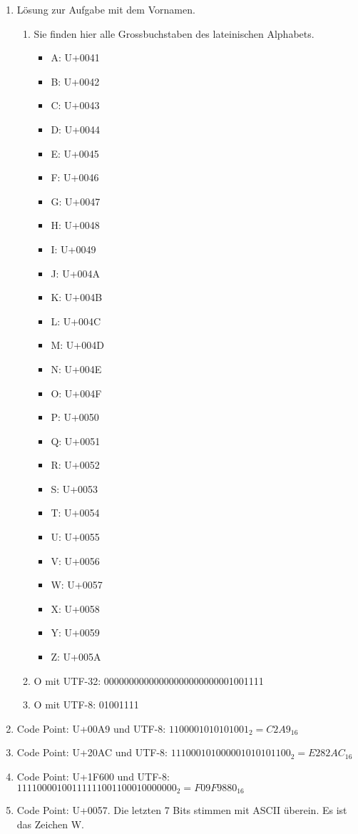 \begin{enumerate}
\item Lösung zur Aufgabe mit dem Vornamen.
\begin{enumerate}
\item Sie finden hier alle Grossbuchstaben des lateinischen Alphabets.
\begin{multicols}{4}
\begin{itemize}
\item A: U+0041
\item B: U+0042
\item C: U+0043
\item D: U+0044
\item E: U+0045
\item F: U+0046
\item G: U+0047
\item H: U+0048
\item I: U+0049
\item J: U+004A
\item K: U+004B
\item L: U+004C
\item M: U+004D
\item N: U+004E
\item O: U+004F
\item P: U+0050
\item Q: U+0051
\item R: U+0052
\item S: U+0053
\item T: U+0054
\item U: U+0055
\item V: U+0056
\item W: U+0057
\item X: U+0058
\item Y: U+0059
\item Z: U+005A
\end{itemize}
\end{multicols}
\item O mit UTF-32: 00000000000000000000000001001111
\item O mit UTF-8: 01001111
\end{enumerate}
\item Code Point: U+00A9 und UTF-8: $1100001010101001_2 = C2A9_{16}$
\item Code Point: U+20AC und UTF-8: $111000101000001010101100_2 = E282AC_{16}$
\item Code Point: U+1F600 und UTF-8: $11110000100111111001100010000000_2 = F09F9880_{16}$
\item Code Point: U+0057. Die letzten 7 Bits stimmen mit ASCII überein. Es ist das Zeichen W.

\end{enumerate}
